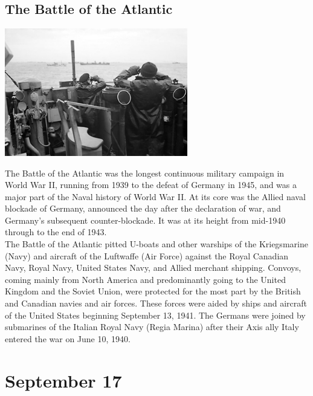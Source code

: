 \documentclass[11pt]{report}
\begin{document}
\subsection{The Battle of the Atlantic}
\vspace{2mm}\begin{center}\includegraphics[width=8cm]{./img/atlanticBattle.jpg}\end{center}
The Battle of the Atlantic was the longest continuous military campaign in World War II, running from 1939 to the defeat of Germany in 1945, and was a major part of the Naval history of World War II. At its core was the Allied naval blockade of Germany, announced the day after the declaration of war, and Germany's subsequent counter-blockade. It was at its height from mid-1940 through to the end of 1943.\\ \indent The Battle of the Atlantic pitted U-boats and other warships of the Kriegsmarine (Navy) and aircraft of the Luftwaffe (Air Force) against the Royal Canadian Navy, Royal Navy, United States Navy, and Allied merchant shipping. Convoys, coming mainly from North America and predominantly going to the United Kingdom and the Soviet Union, were protected for the most part by the British and Canadian navies and air forces. These forces were aided by ships and aircraft of the United States beginning September 13, 1941. The Germans were joined by submarines of the Italian Royal Navy (Regia Marina) after their Axis ally Italy entered the war on June 10, 1940.
\section{September 17}
\end{document}
